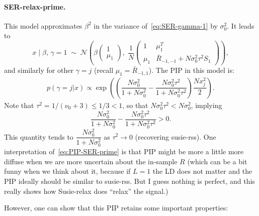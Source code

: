 \documentclass[11pt]{article}
\begin{document}
\paragraph{SER-relax-prime.} This model approximates $\beta^2$ in the variance of~\eqref{eq:SER-gamma-1} by $\sigma_{0}^2$. It leads to 
\begin{equation}\label{eq:SER-prime-gamma-1}
x \mid \beta,\,\gamma=1 \;\sim\;
\mathcal{N}\!\left(
  \beta\begin{pmatrix}1\\\mu_1\end{pmatrix},\;
  \frac{1}{N}\begin{pmatrix}1 & \mu_1^T \\ \mu_1 & \bar{R}_{-1,-1}+N\sigma_0^2\tau^2 S_1\end{pmatrix}
\right),
\end{equation}
and similarly for other $\gamma = j$ (recall $\mu_1 = \bar{R}_{-1, 1}$). The PIP in this model is:
\begin{align}\label{eq:PIP-SER-prime}
p(\gamma=j | x) 
\propto \exp\left(\left(\dfrac{N \sigma_0^2}{1 + N \sigma_0^2} - \dfrac{N \sigma_0^2 \tau^2}{1 + N \sigma_0^2 \tau^2} \right) \dfrac{N x_j^2}{2} \right).
\end{align}
Note that $\tau^2 = 1 / (\nu_0 + 3) \leq 1/ 3 < 1$, so that $N \sigma_0^2 \tau^2 < N \sigma_0^2$, implying
$$ \dfrac{N \sigma_0^2}{1 + N \sigma_0^2} - \dfrac{N \sigma_0^2 \tau^2}{1 + N \sigma_0^2 \tau^2} > 0.$$
This quantity tends to $\dfrac{N \sigma_0^2}{1 + N \sigma_0^2}$ as $\tau^2 \to 0$ (recovering susie-rss). One interpretation of~\eqref{eq:PIP-SER-prime} is that PIP might be more a little more diffuse when we are more uncertain about the in-sample $R$ (which can be a bit funny when we think about it, because if $L = 1$ the LD does not matter and the PIP ideally should be similar to susie-rss. But I guess nothing is perfect, and this really shows how Susie-relax does ``relax'' the signal.) 

However, one can show that this PIP retains some important properties:
\end{document}
